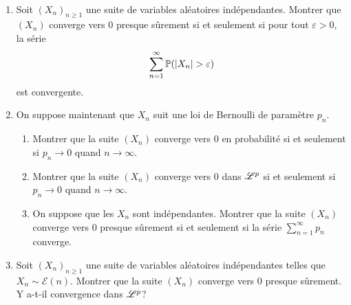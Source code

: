 \begin{td-exo}[]\, %
    \begin{enumerate}
        \item Soit \({(X_n)}_{n\geq 1}\) une suite de variables aléatoires
        indépendantes. Montrer que \((X_n)\) converge vers 0 presque
        sûrement si et seulement si pour tout \(\varepsilon>0\),
        la série
        \begin{equation*}
            \sum_{n=1}^\infty \bb P(|X_n|>\varepsilon)
        \end{equation*}
        est convergente.

        \item On suppose maintenant que \(X_n\) suit une loi
        de Bernoulli de paramètre \(p_n\).
        \begin{enumerate}
            \item Montrer que la suite \((X_n)\) converge
            vers 0 en probabilité si et seulement si
            \(p_n\to 0\) quand \(n\to\infty\).

            \item Montrer que la suite \((X_n)\) converge
            vers 0 dans \(\mathscr{L}^p\) si et seulement si
            \(p_n\to 0\) quand \(n\to\infty\).

            \item On suppose que les \(X_n\) sont indépendantes.
            Montrer que la suite \((X_n)\) converge vers 0
            presque sûrement si et seulement si la série
            \(\sum_{n=1}^\infty p_n\) converge.
        \end{enumerate}

        \item Soit \({(X_n)}_{n\geq 1}\) une suite de variables aléatoires
        indépendantes telles que \(X_n \sim \mathcal E(n)\). Montrer
        que la suite \((X_n)\) converge vers 0 presque sûrement.
        Y a-t-il convergence dans \(\mathscr{L}^p\)?
    \end{enumerate}
\end{td-exo}

